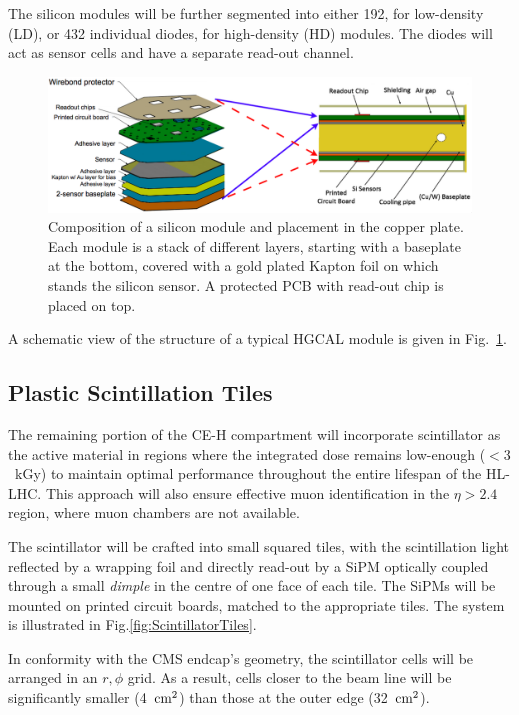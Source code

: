 The silicon modules will be further segmented into either 192, for low-density (LD), or 432 individual diodes, for high-density (HD) modules. The diodes will act as sensor cells and have a separate read-out channel.

\begin{figure}
    \centering
    \includegraphics[width=0.9\linewidth]{Figures/HGCAL/ModuleDesign.png}
    \caption{Composition of a silicon module and placement in the copper plate. Each module is a stack of different layers, starting with a baseplate at the bottom, covered with a gold plated Kapton foil on which stands the silicon sensor. A protected PCB with read-out chip is placed on top.}
    \label{fig:ModuleDesign}
\end{figure}

A schematic view of the structure of a typical HGCAL module is given in Fig.~\ref{fig:ModuleDesign}.

\subsection{Plastic Scintillation Tiles}
\label{sec:Plastic Scintillation Tiles}

The remaining portion of the CE-H compartment will incorporate scintillator as the active material in regions where the integrated dose remains low-enough ($<3$~kGy) to maintain optimal performance throughout the entire lifespan of the HL-LHC. 
This approach will also ensure effective muon identification in the $\eta>2.4$ region, where muon chambers are not available.

The scintillator will be crafted into small squared tiles, with the scintillation light reflected by a wrapping foil and directly read-out by a SiPM optically coupled through a small \textit{dimple} in the centre of one face of each tile. The SiPMs will be mounted on printed circuit boards, matched to the appropriate tiles. 
The system is illustrated in Fig.\ref{fig:ScintillatorTiles}.

In conformity with the CMS endcap's geometry, the scintillator cells will be arranged in an $r,\phi$ grid. As a result, cells closer to the beam line will be significantly smaller (4~$\textnormal{cm}^2$) than those at the outer edge (32~$\textnormal{cm}^2$). 

